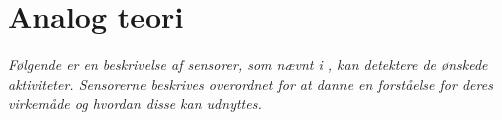 \section{Analog teori}
\textit{Følgende er en beskrivelse af sensorer, som nævnt i , kan detektere de ønskede aktiviteter. Sensorerne beskrives overordnet for at danne en forståelse for deres virkemåde og hvordan disse kan udnyttes.}